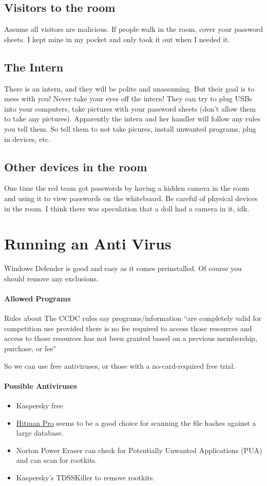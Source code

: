 \documentclass{article}
\begin{document}
\subsection{Visitors to the room}
Assume all visitors are malicious.
If people walk in the room, cover your password sheets. I kept mine in my pocket and only took it out when I needed it. 

\subsection{The Intern}
There is an intern, and they will be polite and unassuming. But their goal is to mess with you! Never take your eyes off the intern!
They can try to plug USBs into your computers, take pictures with your password sheets (don't allow them to take any pictures).
Apparently the intern and her handler will follow any rules you tell them. So tell them to not take picures, install unwanted programs, plug in devices, etc.

\subsection{Other devices in the room}
One time the red team got passwords by having a hidden camera in the room and using it to view passwords on the whiteboard. 
Be careful of physical devices in the room. I think there was speculation that a doll had a camera in it, idk.

\section{Running an Anti Virus}
Windows Defender is good and easy as it comes preinstalled. Of course you should remove any exclusions.

\paragraph{Allowed Programs} Rules about The CCDC rules say programs/information ``are completely valid for competition use provided there is no 
fee required to access those resources and access to 
those resources has not been granted based on a previous membership, purchase, or fee"

\noindent So we can use free antiviruses, or those with a no-card-required free trial.

\paragraph{Possible Antiviruses}
\begin{itemize}
\item Kaspersky free
\item \href{https://www.sophos.com/en-us/free-tools/hitmanpro}{Hitman Pro}
seems to be a good choice for scanning the file hashes against a large database.
\item Norton Power Eraser can check for Potentially Unwanted Applications (PUA) and can scan for rootkits.
\item Kaspersky's TDSSKiller to remove rootkits.
\end{itemize}
\end{document}
